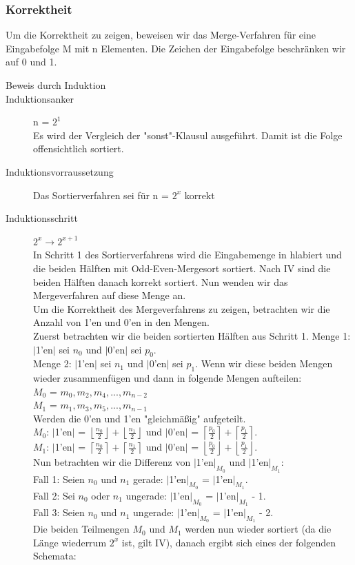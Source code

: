 \documentclass[11pt]{article}
\begin{document}
\subsubsection{Korrektheit}
Um die Korrektheit zu zeigen, beweisen wir das Merge-Verfahren für eine Eingabefolge M mit n Elementen. Die Zeichen der Eingabefolge beschränken wir auf 0 und 1.
\begin{description}
\item[Beweis durch Induktion]
\item[Induktionsanker] n = $2^1$\\ Es wird der Vergleich der "sonst"-Klausul ausgeführt. Damit ist die Folge offensichtlich sortiert.
\item[Induktionsvorraussetzung] Das Sortierverfahren sei für n = $2^x$ korrekt
\item[Induktionsschritt] $2^x \rightarrow 2^{x+1}$\\In Schritt 1 des Sortierverfahrens wird die Eingabemenge in hlabiert und die beiden Hälften mit Odd-Even-Mergesort sortiert. Nach IV sind die beiden Hälften danach korrekt sortiert. Nun wenden wir das Mergeverfahren auf diese Menge an.\\Um die Korrektheit des Mergeverfahrens zu zeigen, betrachten wir die Anzahl von 1'en und 0'en in den Mengen.\\Zuerst betrachten wir die beiden sortierten Hälften aus Schritt 1. Menge 1: $|$1'en$|$ sei $n_0$ und $|$0'en$|$ sei $p_0$.\\Menge 2: $|$1'en$|$ sei $n_1$ und $|$0'en$|$ sei $p_1$. Wenn wir diese beiden Mengen wieder zusammenfügen und dann in folgende Mengen aufteilen: \\$M_0$ = $m_0, m_2, m_4, ..., m_{n-2}$\\$M_1$ = $m_1, m_3, m_5, ..., m_{n-1}$\\Werden die 0'en und 1'en "gleichmäßig" aufgeteilt.\\$M_0$: $|$1'en$|$ = $\left\lfloor \frac{n_0}{2} \right\rfloor + \left\lfloor \frac{n_1}{2} \right\rfloor$ und $|$0'en$|$ = $\left\lceil \frac{p_0}{2} \right\rceil + \left\lceil \frac{p_1}{2} \right\rceil$.\\$M_1$: $|$1'en$|$ = $\left\lceil \frac{n_0}{2} \right\rceil + \left\lceil \frac{n_1}{2} \right\rceil$ und $|$0'en$|$ = $\left\lfloor \frac{p_0}{2} \right\rfloor + \left\lfloor \frac{p_1}{2} \right\rfloor$.\\Nun betrachten wir die Differenz von $|$1'en$|_{M_0}$ und $|$1'en$|_{M_1}$:\\
Fall 1: Seien $n_0$ und $n_1$ gerade: $|$1'en$|_{M_0}$ = $|$1'en$|_{M_1}$.\\Fall 2: Sei $n_0$ oder $n_1$ ungerade: $|$1'en$|_{M_0}$ = $|$1'en$|_{M_1}$ - 1.\\Fall 3: Seien $n_0$ und $n_1$ ungerade: $|$1'en$|_{M_0}$ = $|$1'en$|_{M_1}$ - 2.\\Die beiden Teilmengen $M_0$ und $M_1$ werden nun wieder sortiert (da die Länge wiederrum $2^x$ ist, gilt IV), danach ergibt sich eines der folgenden Schemata:\\

\end{description}
\end{document}

